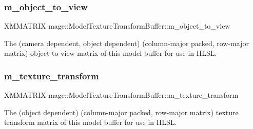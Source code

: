 \subsubsection{\texorpdfstring{m\+\_\+object\+\_\+to\+\_\+view}{m\_object\_to\_view}}
{\footnotesize\ttfamily X\+M\+M\+A\+T\+R\+IX mage\+::\+Model\+Texture\+Transform\+Buffer\+::m\+\_\+object\+\_\+to\+\_\+view}

The (camera dependent, object dependent) (column-\/major packed, row-\/major matrix) object-\/to-\/view matrix of this model buffer for use in H\+L\+SL. \hypertarget{structmage_1_1_model_texture_transform_buffer_aec121458581c6508c8caaab65b073b73}{}\label{structmage_1_1_model_texture_transform_buffer_aec121458581c6508c8caaab65b073b73} 
\subsubsection{\texorpdfstring{m\+\_\+texture\+\_\+transform}{m\_texture\_transform}}
{\footnotesize\ttfamily X\+M\+M\+A\+T\+R\+IX mage\+::\+Model\+Texture\+Transform\+Buffer\+::m\+\_\+texture\+\_\+transform}

The (object dependent) (column-\/major packed, row-\/major matrix) texture transform matrix of this model buffer for use in H\+L\+SL. 